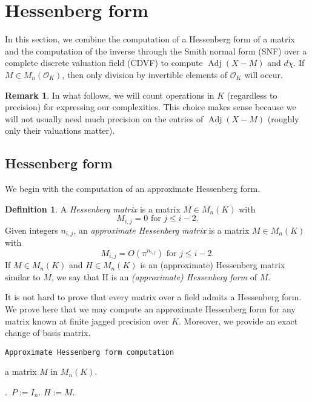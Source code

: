 \documentclass[sigconf]{acmart}
\DeclareMathOperator{\adj}{Adj}
\newcommand{\OK}{\mathcal{O}_K}
\theoremstyle{definition}
\newtheorem{rem}[theo]{Remark}
\newtheorem{deftn}[theo]{Definition}
\begin{document}
\section{Hessenberg form}
\label{sec:diffHess}

In this section, we combine the computation of a Hessenberg form of a 
matrix and the computation of the inverse through the Smith normal form 
(SNF) over a complete discrete valuation field (CDVF) to compute 
$\adj(X{-}M)$ and $d \chi$. If $M \in M_n(\OK)$, then only division 
by invertible elements of $\OK$ will occur.

\begin{rem}
In what follows, we will count operations in $K$ (regardless to 
precision) for expressing our complexities. This choice makes sense 
because we will not usually need much precision on the entries of 
$\adj(X{-}M)$ (roughly only their valuations matter).
\end{rem}

\subsection{Hessenberg form}

We begin with the computation of
an approximate Hessenberg form.

\begin{deftn}
A \emph{Hessenberg matrix} is a matrix $M \in M_n(K)$ with
\[
M_{i,j}=0 \mbox{ for $j \le i-2$.}
\]
Given integers $n_{i,j}$, an \emph{approximate Hessenberg matrix}
is a matrix $M \in M_n(K)$ with
\[
M_{i,j} = O(\pi^{n_{i,j}}) \mbox{ for $j \le i-2$.}
\]
If $M \in M_n (K)$ and $H \in M_n (K)$ is an (approximate) Hessenberg matrix
similar to $M$, we say that H is an \emph{(approximate) Hessenberg form} of $M.$
\end{deftn}

It is not hard to prove that every matrix over a field admits
a Hessenberg form.
We prove here that we may compute an approximate Hessenberg form 
for any matrix known at finite jagged precision over $K$.
Moreover, we provide an exact change of basis matrix.

\noindent\hrulefill

 {\tt Approximate Hessenberg form computation}

 a matrix $M$ in $M_n(K).$

\smallskip

.\ $P:=I_n.$ \: $H:=M.$
\end{document}
